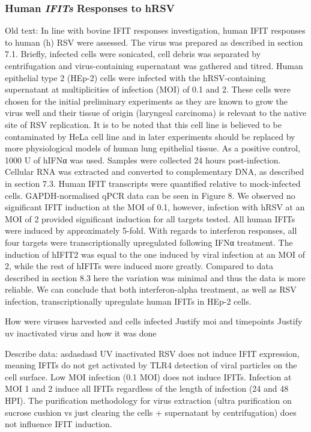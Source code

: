 \subsubsection{Human \textit{IFITs} Responses to hRSV} \label{Human \textit{IFITs} Responses to hRSV}
Old text:
In line with bovine IFIT responses investigation, human IFIT responses to human (h) RSV were assessed. The virus was prepared as described in section 7.1. Briefly, infected cells were sonicated, cell debris was separated by centrifugation and virus-containing supernatant was gathered and titred. Human epithelial type 2 (HEp-2) cells were infected with the hRSV-containing supernatant at multiplicities of infection (MOI) of 0.1 and 2. These cells were chosen for the initial preliminary experiments as they are known to grow the virus well and their tissue of origin (laryngeal carcinoma) is relevant to the native site of RSV replication. It is to be noted that this cell line is believed to be contaminated by HeLa cell line and in later experiments should be replaced by more physiological models of human lung epithelial tissue. As a positive control, 1000 U of hIFNα was used. Samples were collected 24 hours post-infection. Cellular RNA was extracted and converted to complementary DNA, as described in section 7.3. Human IFIT transcripts were quantified relative to mock-infected cells. GAPDH-normalised qPCR data can be seen in Figure 8. We observed no significant IFIT induction at the MOI of 0.1, however, infection with hRSV at an MOI of 2 provided significant induction for all targets tested. All human IFITs were induced by approximately 5-fold. With regards to interferon responses, all four targets were transcriptionally upregulated following IFNα treatment. The induction of hIFIT2 was equal to the one induced by viral infection at an MOI of 2, while the rest of hIFITs were induced more greatly. Compared to data described in section 8.3 here the variation was minimal and thus the data is more reliable. We can conclude that both interferon-alpha treatment, as well as RSV infection, transcriptionally upregulate human IFITs in HEp-2 cells.

How were viruses harvested and cells infected \newline
Justify moi and timepoints \newline
Justify uv inactivated virus and how it was done \newline

Describe data: \newline
asdasdasd \newline
UV inactivated RSV does not induce IFIT expression, meaning IFITs do not get activated by TLR4 detection of viral particles on the cell surface. Low MOI infection (0.1 MOI) does not induce IFITs. Infection at MOI 1 and 2 induce all IFITs regardless of the length of infection (24 and 48 HPI). The purification methodology for virus extraction (ultra purification on sucrose cushion vs just clearing the cells + supernatant by centrifugation) does not influence IFIT induction.

